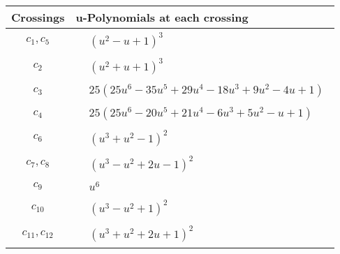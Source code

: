 \documentclass[1p]{elsarticle_modified}
\theoremstyle{definition}
\begin{document}
\begin{tabular}{m{50pt}|m{274pt}}
Crossings & \hspace{64pt}u-Polynomials at each crossing \\
\hline $$\begin{aligned}c_{1},c_{5}\end{aligned}$$&$\begin{aligned}
&(u^2- u+1)^3
\end{aligned}$\\
\hline $$\begin{aligned}c_{2}\end{aligned}$$&$\begin{aligned}
&(u^2+u+1)^3
\end{aligned}$\\
\hline $$\begin{aligned}c_{3}\end{aligned}$$&$\begin{aligned}
&25(25 u^6-35 u^5+29 u^4-18 u^3+9 u^2-4 u+1)
\end{aligned}$\\
\hline $$\begin{aligned}c_{4}\end{aligned}$$&$\begin{aligned}
&25(25 u^6-20 u^5+21 u^4-6 u^3+5 u^2- u+1)
\end{aligned}$\\
\hline $$\begin{aligned}c_{6}\end{aligned}$$&$\begin{aligned}
&(u^3+u^2-1)^2
\end{aligned}$\\
\hline $$\begin{aligned}c_{7},c_{8}\end{aligned}$$&$\begin{aligned}
&(u^3- u^2+2 u-1)^2
\end{aligned}$\\
\hline $$\begin{aligned}c_{9}\end{aligned}$$&$\begin{aligned}
&u^6
\end{aligned}$\\
\hline $$\begin{aligned}c_{10}\end{aligned}$$&$\begin{aligned}
&(u^3- u^2+1)^2
\end{aligned}$\\
\hline $$\begin{aligned}c_{11},c_{12}\end{aligned}$$&$\begin{aligned}
&(u^3+u^2+2 u+1)^2
\end{aligned}$\\
\hline
\end{tabular}\\~\\
\end{document}
